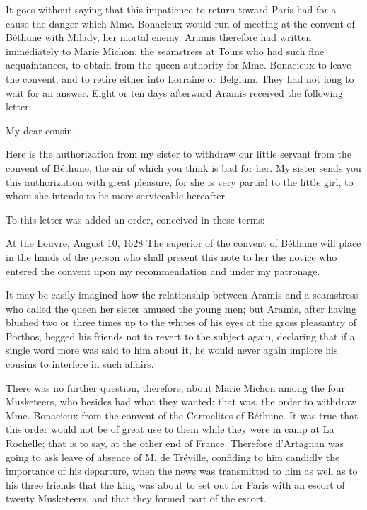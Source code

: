 It goes without saying that this impatience to return toward Paris had for a cause the danger which Mme. Bonacieux would run of meeting at the convent of Béthune with Milady, her mortal enemy. Aramis therefore had written immediately to Marie Michon, the seamstress at Tours who had such fine acquaintances, to obtain from the queen authority for Mme. Bonacieux to leave the convent, and to retire either into Lorraine or Belgium. They had not long to wait for an answer. Eight or ten days afterward Aramis received the following letter: 

\begin{mail}{}{My dear cousin,}
	
Here is the authorization from my sister to withdraw our little servant from the convent of Béthune, the air of which you think is bad for her. My sister sends you this authorization with great pleasure, for she is very partial to the little girl, to whom she intends to be more serviceable hereafter. 

\end{mail}

To this letter was added an order, conceived in these terms: 

\begin{mail}{At the Louvre, August 10, 1628}{}
The superior of the convent of Béthune will place in the hands of the person who shall present this note to her the novice who entered the convent upon my recommendation and under my patronage. 
\end{mail}

It may be easily imagined how the relationship between Aramis and a seamstress who called the queen her sister amused the young men; but Aramis, after having blushed two or three times up to the whites of his eyes at the gross pleasantry of Porthos, begged his friends not to revert to the subject again, declaring that if a single word more was said to him about it, he would never again implore his cousins to interfere in such affairs. 

There was no further question, therefore, about Marie Michon among the four Musketeers, who besides had what they wanted: that was, the order to withdraw Mme. Bonacieux from the convent of the Carmelites of Béthune. It was true that this order would not be of great use to them while they were in camp at La Rochelle; that is to say, at the other end of France. Therefore d'Artagnan was going to ask leave of absence of M. de Tréville, confiding to him candidly the importance of his departure, when the news was transmitted to him as well as to his three friends that the king was about to set out for Paris with an escort of twenty Musketeers, and that they formed part of the escort. 

